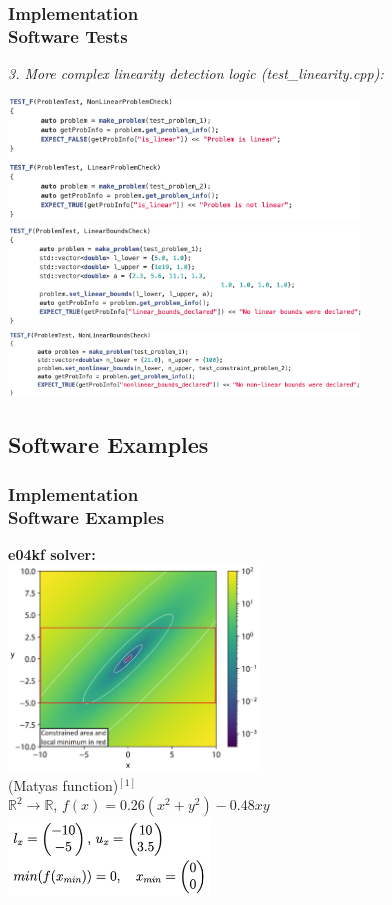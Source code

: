 \documentclass[ucs,10pt]{beamer}
\begin{document}
\begin{frame}
\frametitle{Implementation \\
\small \color{rwth-blue} Software Tests}
\vspace{1em}
\textit{3. More complex linearity detection logic (test\_linearity.cpp):}\vspace{1ex}

\includegraphics[width=0.7\textwidth]{test3.1.png}
\includegraphics[width=0.7\textwidth]{test3.2.png}
\includegraphics[width=0.7\textwidth]{test3.3.png}
\end{frame}

\subsection{Software Examples}
\begin{frame}
\frametitle{Implementation \\
\small \color{rwth-blue} Software Examples}
\textbf{e04kf solver:}\\
\centering
\includegraphics[width=0.5\textwidth]{eg_kf.png}\\
(Matyas function)$^{[1]}$ \\$\mathbb{R}^2\rightarrow \mathbb{R}$, $f(x)=0.26({x}^2+{y}^2)-0.48{x}{y}$\\
\includegraphics[width=0.4\textwidth]{eg_kf2.png}
\end{frame}
\end{document}
